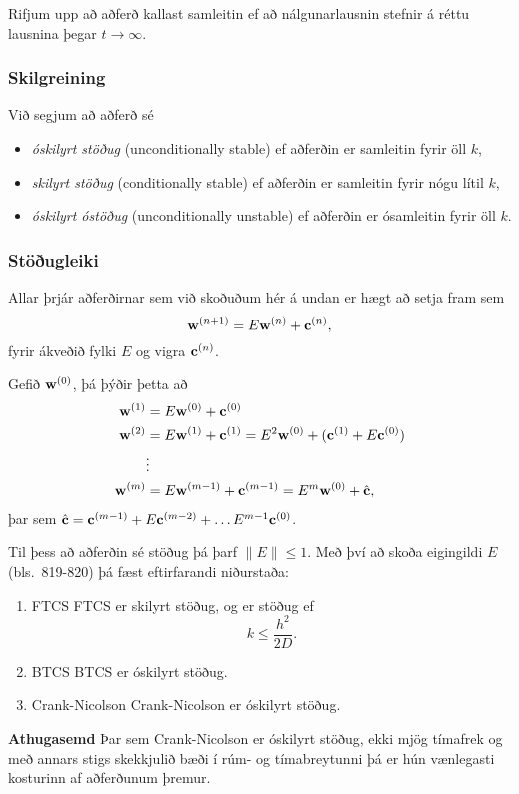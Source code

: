 \documentclass[icelandic,a4paper,12pt]{article}
\begin{document}
  
  Rifjum upp að aðferð kallast samleitin ef að nálgunarlausnin stefnir á 
  réttu lausnina þegar $t\to \infty$.
  
  \pause
  \subsubsection{Skilgreining}
    Við segjum að aðferð sé
    \begin{itemize}
     \item \emph{óskilyrt stöðug} (unconditionally stable) ef aðferðin er samleitin fyrir öll $k$, \pause
     \item \emph{skilyrt stöðug} (conditionally stable) ef aðferðin er samleitin fyrir nógu lítil $k$,\pause
     \item \emph{óskilyrt óstöðug} (unconditionally unstable) ef aðferðin er ósamleitin fyrir öll $k$.
    \end{itemize}

  

 
 
 \subsubsection{Stöðugleiki}
Allar þrjár aðferðirnar sem  við skoðuðum hér á undan er hægt að setja
fram sem 
 $$
  \mbox{${\bf w}$}^{(n+1)} = E\mbox{${\bf w}$}^{(n)} + \mbox{${\bf c}$}^{(n)},
 $$
fyrir ákveðið fylki $E$ og vigra $\mbox{${\bf c}$}^{(n)}$.
 \pause
 \medskip
 
Gefið $\mbox{${\bf w}$}^{(0)}$, þá þýðir þetta að
 \begin{align*}
  \mbox{${\bf w}$}^{(1)} &= E\mbox{${\bf w}$}^{(0)} + \mbox{${\bf c}$}^{(0)} \\
  \mbox{${\bf w}$}^{(2)} &= E\mbox{${\bf w}$}^{(1)} + \mbox{${\bf c}$}^{(1)} = E^2 \mbox{${\bf w}$}^{(0)} + (\mbox{${\bf c}$}^{(1)} + E\mbox{${\bf c}$}^{(0)}) \\
  &\vdots \\
  \mbox{${\bf w}$}^{(m)} &= E\mbox{${\bf w}$}^{(m-1)} + \mbox{${\bf c}$}^{(m-1)} = E^m \mbox{${\bf w}$}^{(0)} + \hat{\mbox{${\bf c}$}}, \\
  \end{align*}
þar sem $\hat{\mbox{${\bf c}$}} = \mbox{${\bf c}$}^{(m-1)} + E\mbox{${\bf c}$}^{(m-2)} + \ldots E^{m-1} \mbox{${\bf c}$}^{(0)}$.
  \pause
  
  
Til þess að aðferðin sé stöðug þá þarf $\|E\| \leq 1$. Með því að 
skoða eigingildi $E$ (bls.~819-820) þá fæst eftirfarandi niðurstaða:
  
  
\begin{enumerate}
\item FTCS
   FTCS er skilyrt stöðug, og er stöðug ef 
   $$
    k \leq \frac{h^2}{2D}.
    $$
  
\item BTCS
   BTCS er óskilyrt stöðug.
  
  
\item Crank-Nicolson
   Crank-Nicolson er óskilyrt stöðug. 
  
\pause
\end{enumerate}  
\textbf{Athugasemd}
   Þar sem Crank-Nicolson er óskilyrt stöðug, ekki mjög tímafrek
   og með annars stigs 
   skekkjulið bæði í rúm- og tímabreytunni þá er hún vænlegasti kosturinn
   af aðferðunum þremur.
  
\end{document}
